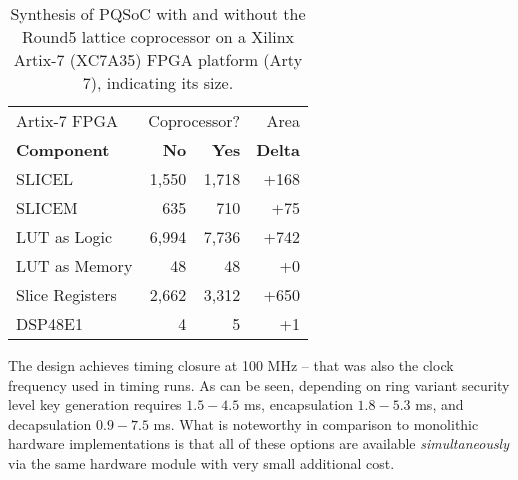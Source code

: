 \documentclass[a4paper]{article}
\begin{document}
\begin{table}
\begin{center}

	\begin{tabular}{| l | r r r |}
	\hline
	Artix-7 FPGA 	& \multicolumn{2}{r}{Coprocessor?} & Area \\
	{\bf Component} & {\bf No } & {\bf Yes} & {\bf Delta} \\
	\hline
	SLICEL        	& 1,550		& 1,718		& +168	\\
	SLICEM        	&   635		&   710		& +75	\\
	LUT as Logic  	& 6,994		& 7,736		& +742	\\
	LUT as Memory	&    48		&    48		& +0	\\
	Slice Registers	& 2,662		& 3,312		& +650	\\
	DSP48E1       	&     4		&    5		& +1	\\
	\hline
\end{tabular}

	\caption{Synthesis of PQSoC with and without the Round5 lattice
	coprocessor on a Xilinx Artix-7 (XC7A35) FPGA platform (Arty 7), 
	indicating its size.}
	\label{tab:fpgasize}
\end{center}
\end{table}

The design achieves timing closure at 100 MHz -- that was also the clock
frequency used in timing runs. As can be seen, depending on ring variant 
security level key generation requires $1.5 - 4.5$ ms,
encapsulation $1.8 - 5.3$ ms, and decapsulation 
$0.9 - 7.5$ ms. What is noteworthy in comparison to monolithic
hardware implementations is that all of these options are available 
\emph{simultaneously} via the same hardware module with very small additional
cost.
\end{document}
